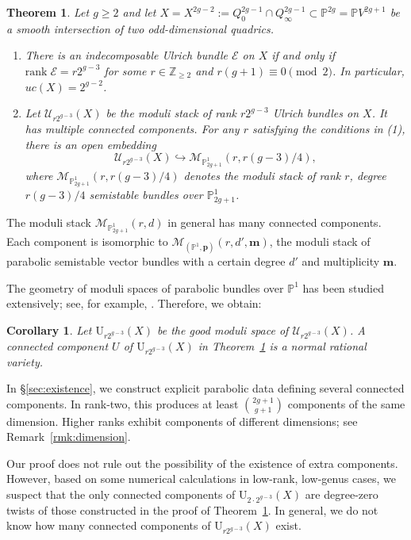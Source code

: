 \documentclass[12pt, letterpaper]{amsart}
\newtheorem{theoremletter}{Theorem}
\newtheorem{corollary}[theorem]{Corollary}
\theoremstyle{definition}
\newcommand{\PP}{\mathbb{P} }
\newcommand{\ZZ}{\mathbb{Z} }
\newcommand{\cE}{\mathcal{E} }
\newcommand{\cM}{\mathcal{M} }
\newcommand{\cU}{\mathcal{U} }
\newcommand{\bp}{\mathbf{p} }
\newcommand{\bm}{\mathbf{m} }
\newcommand{\rU}{\mathrm{U} }
\def\rank{\mathrm{rank}\;}
\begin{document}
\begin{theoremletter}\label{thm:mainthmodd}
Let \(g \ge 2\) and let \(X = X^{2g-2} := Q_{0}^{2g-1} \cap Q_{\infty}^{2g-1} \subset \PP^{2g} = \PP V^{2g+1}\) be a smooth intersection of two odd-dimensional quadrics.
\begin{enumerate}
  \item There is an indecomposable Ulrich bundle \(\cE\) on \(X\) if and only if \(\rank \cE = r2^{g-3}\) for some \(r\in\ZZ_{\ge2}\) and \(r(g+1) \equiv 0 \pmod{2}\). In particular, \(uc(X) = 2^{g-2}\).
  \item Let \(\cU_{r2^{g-3}}(X)\) be the moduli stack of rank \(r2^{g-3}\) Ulrich bundles on \(X\). It has multiple connected components. For any \(r\) satisfying the conditions in (1), there is an open embedding
  \[\cU_{r2^{g-3}}(X) \hookrightarrow \cM_{\PP_{2g+1}^1}(r, r(g-3)/4),\]
  where \(\cM_{\PP_{2g+1}^1}(r, r(g-3)/4)\) denotes the moduli stack of rank \(r\), degree \(r(g-3)/4\) semistable bundles over \(\PP_{2g+1}^1\).
\end{enumerate}
\end{theoremletter}

The moduli stack \(\cM_{\PP_{2g+1}^1}(r,d)\) in general has many connected components. Each component is isomorphic to \(\cM_{(\PP^1, \bp)}(r, d', \bm)\), the moduli stack of parabolic semistable vector bundles with a certain degree \(d'\) and multiplicity \(\bm\).

The geometry of moduli spaces of parabolic bundles over \(\PP^1\) has been studied extensively; see, for example, \cite{MY21}. Therefore, we obtain:

\begin{corollary}\label{cor:oddintersection}
Let \(\rU_{r2^{g-3}}(X)\) be the good moduli space of \(\cU_{r2^{g-3}}(X)\). A connected component \(U\) of \(\rU_{r2^{g-3}}(X)\) in Theorem~\ref{thm:mainthmodd} is a normal rational variety.
\end{corollary}

In \S\ref{sec:existence}, we construct explicit parabolic data defining several connected components. In rank-two, this produces at least \(\binom{2g+1}{g+1}\) components of the same dimension. Higher ranks exhibit components of different dimensions; see Remark~\ref{rmk:dimension}.

Our proof does not rule out the possibility of the existence of extra components. However, based on some numerical calculations in low-rank, low-genus cases, we suspect that the only connected components of \(\rU_{2\cdot2^{g-3}}(X)\) are degree-zero twists of those constructed in the proof of Theorem~\ref{thm:mainthmodd}. In general, we do not know how many connected components of \(\rU_{r2^{g-3}}(X)\) exist.
\end{document}
